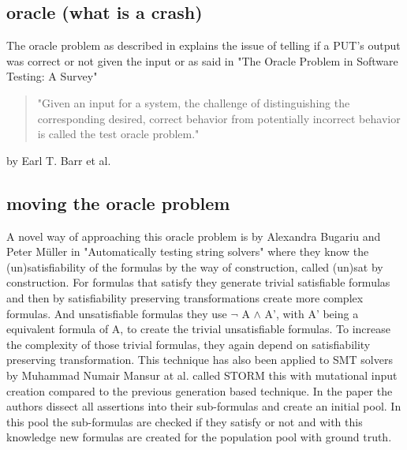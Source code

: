 \subsection{oracle (what is a crash)}
The oracle problem as described in \cite{23OriginalOraclePaper} explains the issue of telling if a PUT's output was correct or not given the input or as said in "The Oracle Problem in Software Testing: A Survey"\cite{10barr2014oracleProblem} 
\begin{quote}
	"Given an input for a system, the challenge of distinguishing the corresponding desired, correct behavior from potentially incorrect behavior is called the test oracle problem."
\end{quote} by Earl T. Barr et al.



\subsection{moving the oracle problem}
A novel way of approaching this oracle problem is by Alexandra Bugariu and Peter M\"uller in "Automatically testing string solvers"\cite{9bugariu2020automaticallyTestingStringSolvers} where they know the (un)satisfiability of the formulas by the way of construction, called (un)sat by construction.  For formulas that satisfy they generate trivial satisfiable formulas and then by satisfiability preserving transformations create more complex formulas. And unsatisfiable formulas they use $\neg$ A $\land$ A', with A' being a equivalent formula of A, to create the trivial unsatisfiable formulas. To increase the complexity of those trivial formulas, they again depend on satisfiability preserving transformation.
This technique has also been applied to SMT solvers by Muhammad Numair Mansur at al. called STORM\cite{1mansur2020detecting} this with mutational input creation compared to the previous generation based technique. In the paper the authors dissect all assertions into their sub-formulas and create an initial pool. In this pool the sub-formulas are checked if they satisfy or not and with this knowledge new formulas are created for the population pool with ground truth.



